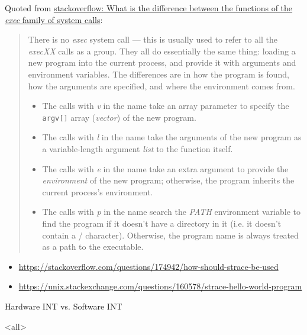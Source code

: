 Quoted from
\href{https://stackoverflow.com/questions/20823371/what-is-the-difference-between-the-functions-of-the-exec-family-of-system-calls}{
  stackoverflow: What is the difference between the functions of the \emph{exec} family of system calls}:

\begin{quote}
  There is no \emph{exec} system call --- this is usually used to refer to all the
  \emph{execXX} calls as a group. They all do essentially the same thing: loading a new
  program into the current process, and provide it with arguments and environment
  variables. The differences are in how the program is found, how the arguments are
  specified, and where the environment comes from.

  \begin{itemize}
  \item The calls with \emph{v} in the name take an array parameter to specify the
    \texttt{argv[]} array (\emph{vector}) of the new program.
  \item The calls with \emph{l} in the name take the arguments of the new program as a
    variable-length argument \emph{list} to the function itself.
  \item The calls with \emph{e} in the name take an extra argument to provide the
    \emph{environment} of the new program; otherwise, the program inherits the current
    process's environment.
  \item The calls with \emph{p} in the name search the \emph{PATH} environment variable to
    find the program if it doesn't have a directory in it (i.e. it doesn't contain a /
    character). Otherwise, the program name is always treated as a path to the executable.
  \end{itemize}
\end{quote}

\begin{itemize}
\item \url{https://stackoverflow.com/questions/174942/how-should-strace-be-used}
\item \url{https://unix.stackexchange.com/questions/160578/strace-hello-world-program}
\end{itemize}

\begin{frame}{Hardware INT vs. Software INT}
  \begin{center}
  \end{center}
\end{frame}

\begin{frame}
  \begin{refsection}
    \nocite{wiki:interrupt, wiki:syscall}
    \printbibliography[heading=none]
  \end{refsection}
\end{frame}
\mode<all>


